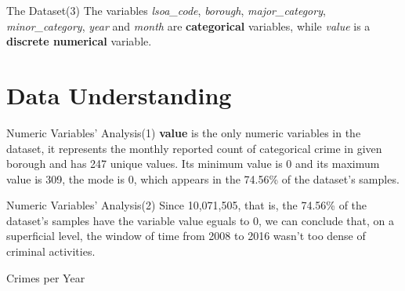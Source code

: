 \documentclass[12pt]{beamer}
\begin{document}
        \begin{frame}{The Dataset(3)}
            The variables \textit{lsoa\_code}, \textit{borough}, \textit{major\_category},
            \textit{minor\_category}, \textit{year} and \textit{month} are \textbf{categorical} variables,
            while \textit{value} is a \textbf{discrete numerical} variable.
        \end{frame}

    \section{Data Understanding} %
    \label{sec:data_understanding}
        \begin{frame}{Numeric Variables' Analysis(1)}
            \textbf{value} is the only numeric variables in the dataset, it represents the monthly reported
            count of categorical crime in given borough and has 247 unique values. Its minimum value is 0 and
            its maximum value is 309, the mode is 0, which appears in the 74.56\% of the dataset's samples.
        \end{frame}

        \begin{frame}{Numeric Variables' Analysis(2)}
            Since 10,071,505, that is, the 74.56\% of the dataset's samples have the variable value eguals to
            0, we can conclude that, on a superficial level, the window of time from 2008 to 2016 wasn't too
            dense of criminal activities.
        \end{frame}

        \begin{frame}{Crimes per Year}
            \begin{figure}
                \centering
            \end{figure}
        \end{frame}
\end{document}
